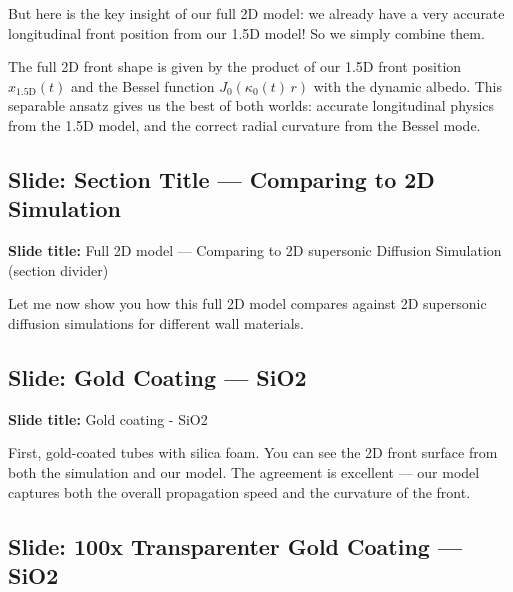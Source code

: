 \documentclass[12pt, a4paper]{article}
\begin{document}
But here is the key insight of our full 2D model: we already have a very accurate longitudinal front position from our 1.5D model! So we simply combine them.

The full 2D front shape is given by the product of our 1.5D front position $x_\mathrm{1.5D}(t)$ and the Bessel function $J_0(\kappa_0(t)\, r)$ with the dynamic albedo. This separable ansatz gives us the best of both worlds: accurate longitudinal physics from the 1.5D model, and the correct radial curvature from the Bessel mode.

\subsection{Slide: Section Title --- Comparing to 2D Simulation}

\begin{slidebox}
\textbf{Slide title:} Full 2D model --- Comparing to 2D supersonic Diffusion Simulation (section divider)
\end{slidebox}

Let me now show you how this full 2D model compares against 2D supersonic diffusion simulations for different wall materials.

\subsection{Slide: Gold Coating --- SiO2}

\begin{slidebox}
\textbf{Slide title:} Gold coating - SiO2
\end{slidebox}

First, gold-coated tubes with silica foam. You can see the 2D front surface from both the simulation and our model. The agreement is excellent --- our model captures both the overall propagation speed and the curvature of the front.

\subsection{Slide: 100x Transparenter Gold Coating --- SiO2}
\end{document}
